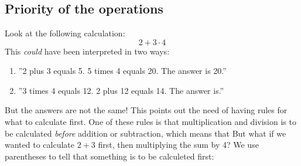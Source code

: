 



\section{\rrek}
\subsection*{Priority of the operations}
Look at the following calculation:
\[ 2+3\cdot4 \]
This \textsl{could} have been interpreted in two ways:
\begin{enumerate}
	\item ''2 plus 3 equals 5. 5 times 4 equals 20. The answer is 20.''
	\item ''3 times 4 equals 12. 2 plus 12 equals 14. The answer is.''
\end{enumerate}
But the answers are not the same! This points out the need of having rules for what to calculate first. One of these rules is that multiplication and division is to be calculated \textsl{before} addition or subtraction, which means that \regv
\st{ \vs
{}
}
But what if we wanted to calculate $ 2+3 $ first, then multiplying the sum by 4? We use parentheses to tell that something is to be calculeted first: \regv
\st{\vs
{}
}\regv

\newpage
{}
